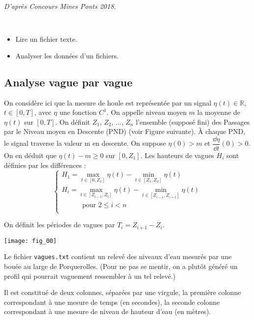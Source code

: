 
%


\begin{flushright}
\textit{D'après Concours Mines Ponts 2018.}
\end{flushright}
\begin{obj} ~\\
\begin{itemize}
\item Lire un fichier texte.
\item Analyser les données d'un fichiers. 
\end{itemize}
\end{obj}

\subsection*{Analyse vague par vague}

On considère ici que la mesure de houle est représentée par un signal $\eta(t) \in \mathbb{R}$, $t\in[0,T]$, avec
$\eta$ une fonction $C^1$.
On appelle niveau moyen $m$ la moyenne de $\eta(t)$ sur $[0, T]$.
On définit $Z_1$, $Z_2$, ..., $Z_n$ l’ensemble (supposé fini) des Passages par le Niveau moyen en Descente
(PND) (voir Figure suivante). À chaque PND, le signal traverse la valeur m en descente.
On suppose $\eta(0)>m$ et $\dfrac{\dd \eta }{\dd t}(0)>0$. On en déduit que $\eta(t)-m\geq 0$ sur $\left[0, Z_1\right]$.
Les hauteurs de vagues $H_i$ sont définies par les différences :
$$
 \left\{ 
\begin{array}{l}
H_1 = \max_{t\in[0,Z_1]} \eta(t)-\min_{t\in[Z_1,Z_2]} \eta(t) \\
H_i = \max_{t\in[Z_{i-1},Z_i]} \eta(t)-\min_{t\in[Z_{i-1},Z_{i+1}]} \eta(t) \\
\quad \quad \quad \text{pour }2\leq i <  n\\
\end{array}
\right.
$$

On définit les périodes de vagues par $T_i = Z_{i+1}-Z_i$.

\begin{center}
\texttt{[image: fig\_00]}
\end{center}

Le fichier \texttt{vagues.txt} contient un relevé des niveaux d'eau mesurés par une bouée au large de Porquerolles. (Pour ne pas se mentir, on a plutôt généré un profil qui pourrait vaguement ressembler à un tel relevé.)

Il est constitué de deux colonnes, séparées par une virgule, la première colonne correspondant à une mesure de temps (en secondes), la seconde colonne correspondant à une mesure de niveau de hauteur d'eau (en mètres). 

